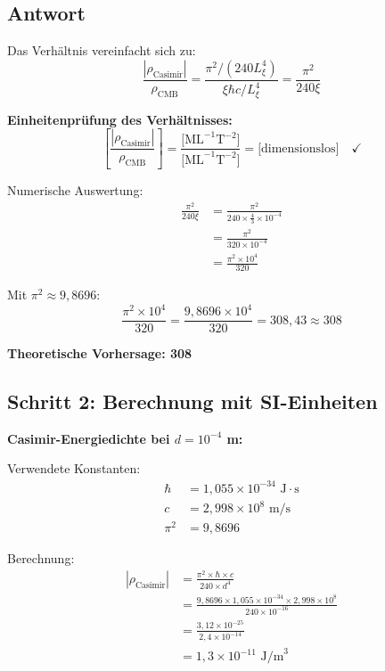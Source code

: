 \documentclass[12pt,a4paper]{article}
\theoremstyle{remark}
\newenvironment{answer}{\subsection*{Antwort}}{\vspace{1em}}
\begin{document}
\begin{answer}
	Das Verhältnis vereinfacht sich zu:
	\begin{equation}
		\frac{|\rho_{\text{Casimir}}|}{\rho_{\text{CMB}}} = \frac{\pi^2/(240L_\xi^4)}{\xi \hbar c/L_\xi^4} = \frac{\pi^2}{240\xi}
	\end{equation}
	
	\begin{units}
		\textbf{Einheitenprüfung des Verhältnisses:}
		\begin{equation}
			\left[\frac{|\rho_{\text{Casimir}}|}{\rho_{\text{CMB}}}\right] = \frac{\text{[ML}^{-1}\text{T}^{-2}\text{]}}{\text{[ML}^{-1}\text{T}^{-2}\text{]}} = \text{[dimensionslos]} \quad \checkmark
		\end{equation}
	\end{units}
	
	Numerische Auswertung:
	\begin{align}
		\frac{\pi^2}{240\xi} &= \frac{\pi^2}{240 \times \frac{4}{3} \times 10^{-4}} \\
		&= \frac{\pi^2}{320 \times 10^{-4}} \\
		&= \frac{\pi^2 \times 10^4}{320}
	\end{align}
	
	Mit $\pi^2 \approx 9{,}8696$:
	\begin{equation}
		\frac{\pi^2 \times 10^4}{320} = \frac{9{,}8696 \times 10^4}{320} = 308{,}43 \approx 308
	\end{equation}
	
	\textbf{Theoretische Vorhersage: 308}
	
	\subsection{Schritt 2: Berechnung mit SI-Einheiten}
	
	\textbf{Casimir-Energiedichte bei $d = 10^{-4}$ m:}
	
	Verwendete Konstanten:
	\begin{align}
		\hbar &= 1{,}055 \times 10^{-34} \text{ J} \cdot \text{s} \\
		c &= 2{,}998 \times 10^8 \text{ m/s} \\
		\pi^2 &= 9{,}8696
	\end{align}
	
	Berechnung:
	\begin{align}
		|\rho_{\text{Casimir}}| &= \frac{\pi^2 \times \hbar \times c}{240 \times d^4} \\
		&= \frac{9{,}8696 \times 1{,}055 \times 10^{-34} \times 2{,}998 \times 10^8}{240 \times 10^{-16}} \\
		&= \frac{3{,}12 \times 10^{-25}}{2{,}4 \times 10^{-14}} \\
		&= 1{,}3 \times 10^{-11} \text{ J/m}^3
	\end{align}
	

\end{answer}
\end{document}

